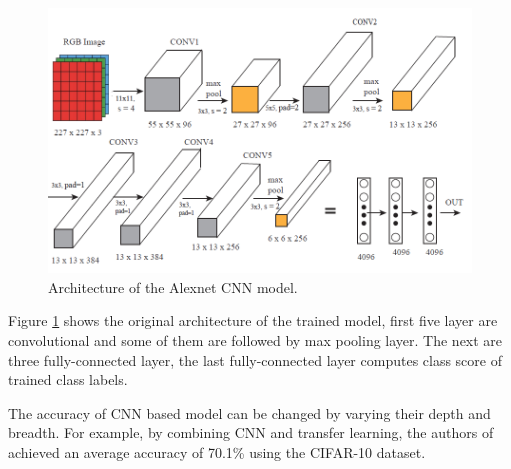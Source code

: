 \begin{figure}
\centering
 \includegraphics[width=0.8\linewidth]{Figures/AlexNet.png}
 \caption{Architecture of the Alexnet CNN model.}
 \label{fig:alex}
\end{figure}
Figure \ref{fig:alex} shows the original architecture of the trained model, first five layer are convolutional and some of them are followed by max pooling layer. The next are three fully-connected layer, the last fully-connected layer computes class score of trained class labels.

The accuracy of CNN based model can be changed by varying their depth and breadth. For example, by combining CNN and transfer learning, the authors of \cite{hussain2018study} achieved an average accuracy of 70.1\% using the CIFAR-10 \cite{krizhevsky2009learning} dataset.

